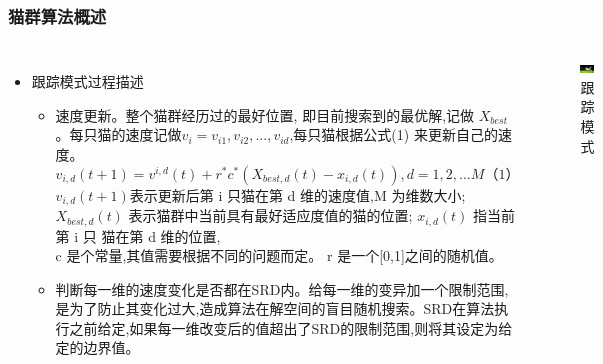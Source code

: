 \begin{frame}
	\frametitle{猫群算法概述}
	\begin{columns}
		\begin{itemize}
			\item {跟踪模式过程描述}
				\begin{itemize}
					\item {速度更新。整个猫群经历过的最好位置, 即目前搜索到的最优解,记做 $X_{best}$ 。每只猫的速度记做$v_i ={v_{i1},v_{i2},...,v_{id}}$,每只猫根据公式(1) 来更新自己的速度。$$v_{i,d}(t+1) = v^{i,d}(t) + r^* c^*(X_{best,d}(t) - x_{i,d}(t)),d = 1,2,…M （1） $$ 
$v_{i,d}(t+1)$表示更新后第 i 只猫在第 d 维的速度值,M 为维数大小; 
$X_{best,d}(t)$ 表示猫群中当前具有最好适应度值的猫的位置; 
$x_{i,d}(t)$ 指当前第 i 只 猫在第 d 维的位置,\\c 是个常量,其值需要根据不同的问题而定。
r 是一个[0,1]之间的随机值。}
					\item {判断每一维的速度变化是否都在SRD内。给每一维的变异加一个限制范围,是为了防止其变化过大,造成算法在解空间的盲目随机搜索。SRD在算法执行之前给定,如果每一维改变后的值超出了SRD的限制范围,则将其设定为给定的边界值。}
				\end{itemize}
		\end{itemize}
		\begin{figure}[htbp]
			\centering
			\includegraphics[width=6cm]{pic/cat3.png}
			\caption{跟踪模式}
		\end{figure}
	\end{columns}
\end{frame}

